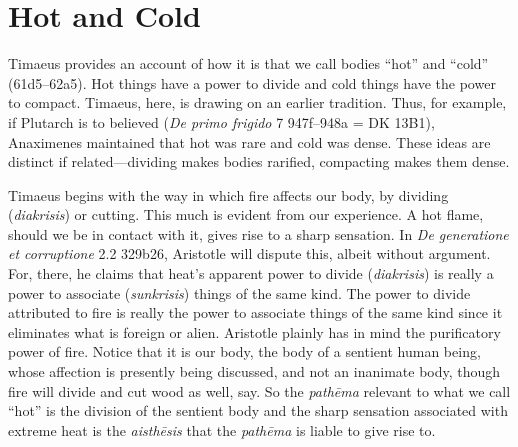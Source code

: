 
\section{Hot and Cold} %
\label{sec:hot_and_cold}

Timaeus provides an account of how it is that we call bodies ``hot'' and ``cold'' (61d5--62a5). Hot things have a power to divide and cold things have the power to compact. Timaeus, here, is drawing on an earlier tradition. Thus, for example, if Plutarch is to believed (\emph{De primo frigido} 7 947f--948a = DK 13B1), Anaximenes maintained that hot was rare and cold was dense. These ideas are distinct if related---dividing makes bodies rarified, compacting makes them dense.

Timaeus begins with the way in which fire affects our body, by dividing (\emph{diakrisis}) or cutting. This much is evident from our experience. A hot flame, should we be in contact with it, gives rise to a sharp sensation. In \emph{De generatione et corruptione} 2.2 329b26, Aristotle will dispute this, albeit without argument. For, there, he claims that heat's apparent power to divide (\emph{diakrisis}) is really a power to associate (\emph{sunkrisis}) things of the same kind. The power to divide attributed to fire is really the power to associate things of the same kind since it eliminates what is foreign or alien. Aristotle plainly has in mind the purificatory power of fire. Notice that it is our body, the body of a sentient human being, whose affection is presently being discussed, and not an inanimate body, though fire will divide and cut wood as well, say. So the \emph{pathēma} relevant to what we call ``hot'' is the division of the sentient body and the sharp sensation associated with extreme heat is the \emph{aisthēsis} that the \emph{pathēma} is liable to give rise to. 

